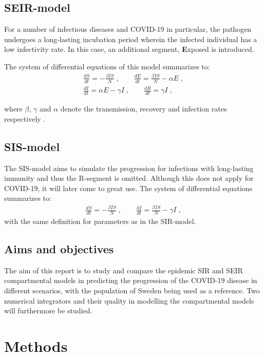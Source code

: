 \documentclass[12pt]{article}
\begin{document}
\subsection{SEIR-model}
For a number of infectious diseases and COVID-19 in particular, the pathogen undergoes a long-lasting incubation period wherein the infected individual has a low infectivity rate. In this case, an additional segment, \textbf{E}xposed is introduced.

\newpage 
\noindent 
The system of differential equations of this model summarizes to:
\begin{gather}
\frac{dS}{dt} = - \frac{\beta I S}{N} \;, \qquad
\frac{dE}{dt} = \frac{\beta I S}{N}- \alpha E \;, \\
\frac{dI}{dt} = \alpha E - \gamma I \;, \qquad 
\frac{dR}{dt} = \gamma I \;,
\end{gather}

\noindent where $\beta$, $\gamma$ and $\alpha$ denote the transmission,  recovery and infection rates respectively \cite{gill}.

\subsection{SIS-model}
The SIS-model aims to simulate the progression for infections with long-lasting immunity and thus the R-segment is omitted. Although this does not apply for COVID-19, it will later come to great use. The system of differential equations summarizes to:
\begin{align}
\frac{dS}{dt} = - \frac{\beta I S}{N} \;, \qquad
\frac{dI}{dt} = \frac{\beta I S}{N}- \gamma I \;, 
\end{align}
with the same definition for parameters as in the SIR-model.

\subsection{Aims and objectives}
The aim of this report is to study and compare the epidemic SIR and SEIR compartmental models in predicting the progression of the COVID-19 disease in different scenarios, with the population of Sweden being used as a reference. Two numerical integrators and their quality in modelling the compartmental models will furthermore be studied.

\newpage 
\section{Methods}
\end{document}
